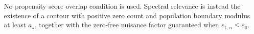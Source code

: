 No propensity-score overlap condition is used.  Spectral relevance is instead the existence of a contour with positive zero count and population boundary modulus at least \(a_{\star}\), together with the zero-free nuisance factor guaranteed when \(\varepsilon_{1,n}\le\varepsilon_0\).